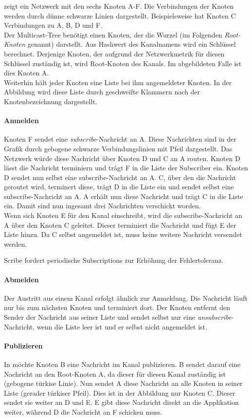  zeigt ein Netzwerk mit den sechs Knoten A-F. Die Verbindungen der Knoten werden durch dünne schwarze Linien dargestellt. Beispielsweise hat Knoten C Verbindungen zu A, B, D und F.\\
Der Multicast-Tree benötigt einen Knoten, der die Wurzel (im Folgenden \emph{Root-Knoten} genannt) darstellt. Aus Hashwert des Kanalnamens wird ein Schlüssel berechnet. Derjenige Knoten, der aufgrund der Netzwerkmetrik für diesen Schlüssel zuständig ist, wird Root-Knoten des Kanals. Im abgebildeten Falle ist dies Knoten A.\\
Weiterhin hält jeder Knoten eine Liste bei ihm angemeldeter Knoten. In der Abbildung wird diese Liste durch geschweifte Klammern nach der Knotenbezeichnung dargestellt.

\paragraph*{Anmelden}
Knoten F sendet eine \emph{subscribe}-Nachricht an A. Diese Nachrichten sind in der Grafik durch gebogene schwarze Verbindungslinien mit Pfeil dargestellt. Das Netzwerk würde diese Nachricht über Knoten D und C an A routen. Knoten D lässt die Nachricht terminiern und trägt F in die Liste der Subscriber ein. Knoten D sendet nun selbst eine subscribe-Nachricht an A. C, über den die Nachricht geroutet wird, terminert diese, trägt D in die Liste ein und sendet selbst eine subscribe-Nachricht an A. A erhält nun diese Nachricht und trägt C in die Liste ein. Damit sind nun ingesamt drei Nachrichten verschickt worden.\\
Wenn sich Knoten E für den Kanal einschreibt, wird die subscribe-Nachricht an A über den Knoten C geleitet. Dieser terminiert die Nachricht und fügt E der Liste hinzu. Da C selbst angemeldet ist, muss keine weitere Nachricht versendet werden.

Scribe fordert periodische Subscriptions zur Erhöhung der Fehlertoleranz.

\paragraph*{Abmelden}
Der Austritt aus einem Kanal erfolgt ähnlich zur Anmeldung. Die Nachricht läuft nur bis zum nächsten Knoten und terminiert dort. Der Knoten entfernt den Sender der Nachricht aus seiner Liste und sendet selbst nur eine \emph{unsubscribe}-Nachricht, wenn die Liste leer ist und er selbst nicht angemeldet ist.

\paragraph*{Publizieren}
In  möchte Knoten B eine Nachricht im Kanal publizieren. B sendet darauf eine Nachricht an den Root-Knoten A, da dieser für diesen Kanal zuständig ist (gebogene türkise Linie). Nun sendet A diese Nachricht an alle Knoten in seiner Liste (gerader türkiser Pfeil). Dies ist in der Abbildung nur Knoten C. Dieser sendet sie weiter an D und E. E gibt diese Nachricht direkt an die Applikation weiter, während D die Nachricht an F schicken muss.


